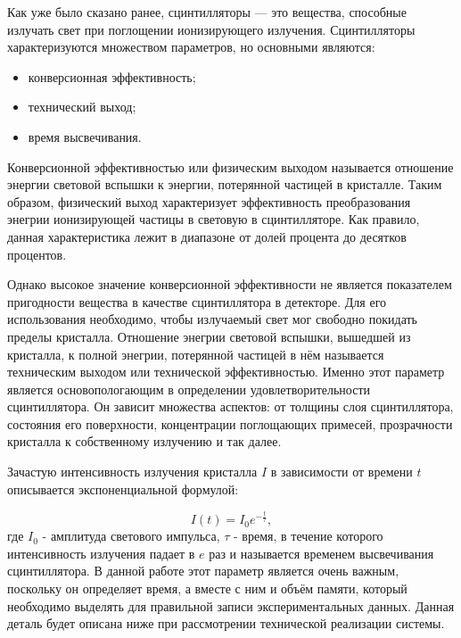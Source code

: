 Как уже было сказано ранее, сцинтилляторы --- это вещества, способные излучать свет при поглощении ионизирующего излучения. Сцинтилляторы характеризуются множеством параметров, но основными являются:
\begin{itemize}
    \item конверсионная эффективность;
    \item технический выход;
    \item время высвечивания.
\end{itemize}\par
Конверсионной эффективностью или физическим выходом называется отношение энергии световой вспышки к энергии, потерянной частицей в кристалле. Таким образом, физический выход характеризует эффективность преобразования энегрии ионизирующей частицы в световую в сцинтилляторе. Как правило, данная характеристика лежит в диапазоне от долей процента до десятков процентов.\par
Однако высокое значение конверсионной эффективности не является показателем пригодности вещества в качестве сцинтиллятора в детекторе. Для его использования необходимо, чтобы излучаемый свет мог свободно покидать пределы кристалла. Отношение энегрии световой вспышки, вышедшей из кристалла, к полной энегрии, потерянной частицей в нём называется техническим выходом или технической эффективностью. Именно этот параметр является основопологающим в определении удовлетворительности сцинтиллятора. Он зависит множества аспектов: от толщины слоя сцинтиллятора, состояния его поверхности, концентрации поглощающих примесей, прозрачности кристалла к собственному излучению и так далее.\par
Зачастую интенсивность излучения кристалла $I$ в зависимости от времени $t$ описывается экспоненциальной формулой:\par
\begin{equation}
    I(t) = I_0 e^{-{\frac t {\tau}}},
\end{equation}
где $I_0$ - амплитуда светового импульса, $\tau$ - время, в течение которого интенсивность излучения падает в $e$ раз и называется временем высвечивания сцинтиллятора. В данной работе этот параметр является очень важным, поскольку он определяет время, а вместе с ним и объём памяти, который необходимо выделять для правильной записи экспериментальных данных. Данная деталь будет описана ниже при рассмотрении технической реализации системы.
